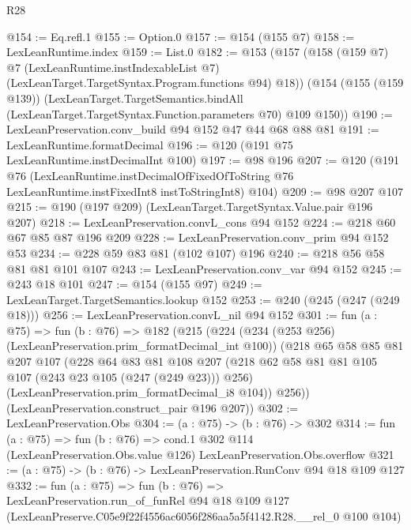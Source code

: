 \begin{lexlean}{R28}
\begin{coremodule}
@154 := Eq.refl.{1}
@155 := Option.{0}
@157 := @154 (@155 @7)
@158 := LexLeanRuntime.index
@159 := List.{0}
@182 := @153
    (@157
      (@158
        (@159 @7)
        @7
        (LexLeanRuntime.instIndexableList @7)
        (LexLeanTarget.TargetSyntax.Program.functions @94)
        @18))
    (@154
      (@155 (@159 @139))
      (LexLeanTarget.TargetSemantics.bindAll
        (LexLeanTarget.TargetSyntax.Function.parameters @70)
        @109
        @150))
@190 := LexLeanPreservation.conv_build @94 @152 @47 @44 @68 @88 @81
@191 := LexLeanRuntime.formatDecimal
@196 := @120 (@191 @75 LexLeanRuntime.instDecimalInt @100)
@197 := @98 @196
@207 := @120
    (@191
      @76
      (LexLeanRuntime.instDecimalOfFixedOfToString
        @76
        LexLeanRuntime.instFixedInt8
        instToStringInt8)
      @104)
@209 := @98 @207 @107
@215 := @190 (@197 @209) (LexLeanTarget.TargetSyntax.Value.pair @196 @207)
@218 := LexLeanPreservation.convL_cons @94 @152
@224 := @218 @60 @67 @85 @87 @196 @209
@228 := LexLeanPreservation.conv_prim @94 @152 @53
@234 := @228 @59 @83 @81 (@102 @107) @196
@240 := @218 @56 @58 @81 @81 @101 @107
@243 := LexLeanPreservation.conv_var @94 @152
@245 := @243 @18 @101
@247 := @154 (@155 @97)
@249 := LexLeanTarget.TargetSemantics.lookup @152
@253 := @240 (@245 (@247 (@249 @18)))
@256 := LexLeanPreservation.convL_nil @94 @152
@301 := fun (a : @75) =>
  fun (b : @76) =>
  @182
    (@215
      (@224
        (@234 (@253 @256) (LexLeanPreservation.prim_formatDecimal_int @100))
        (@218
          @65
          @58
          @85
          @81
          @207
          @107
          (@228
            @64
            @83
            @81
            @108
            @207
            (@218 @62 @58 @81 @81 @105 @107 (@243 @23 @105 (@247 (@249 @23))) @256)
            (LexLeanPreservation.prim_formatDecimal_i8 @104))
          @256))
      (LexLeanPreservation.construct_pair @196 @207))
@302 := LexLeanPreservation.Obs
@304 := (a : @75) -> (b : @76) -> @302
@314 := fun (a : @75) =>
  fun (b : @76) =>
  cond.{1} @302 @114 (LexLeanPreservation.Obs.value @126) LexLeanPreservation.Obs.overflow
@321 := (a : @75) -> (b : @76) -> LexLeanPreservation.RunConv @94 @18 @109 @127
@332 := fun (a : @75) =>
  fun (b : @76) =>
  LexLeanPreservation.run_of_funRel
    @94
    @18
    @109
    @127
    (LexLeanPreserve.C05e9f22f4556ac6056f286aa5a5f4142.R28.__rel_0 @100 @104)
\end{coremodule}
\end{lexlean}
